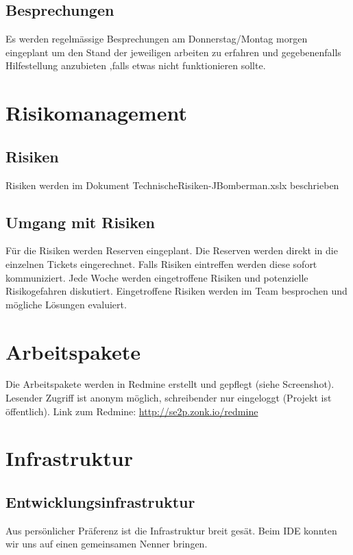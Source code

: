 \documentclass[11pt]{scrartcl}
\begin{document}
\subsection{Besprechungen}
Es werden regelmässige Besprechungen am 
Donnerstag/Montag morgen eingeplant um 
den Stand der jeweiligen arbeiten zu erfahren 
und gegebenenfalls Hilfestellung anzubieten 
,falls etwas nicht funktionieren sollte.

\section{Risikomanagement}
\label{Risikomanagement}
\subsection{Risiken}
\label{sec:Risiken}
Risiken werden im Dokument TechnischeRisiken-JBomberman.xslx beschrieben
\subsection{Umgang mit Risiken}
\label{sec:Umgang mit Risiken}
Für die Risiken werden Reserven eingeplant. Die Reserven werden direkt in die einzelnen Tickets eingerechnet. Falls Risiken eintreffen werden diese sofort kommuniziert. Jede Woche werden eingetroffene Risiken und potenzielle Risikogefahren diskutiert. Eingetroffene Risiken werden im Team besprochen und mögliche Lösungen evaluiert.

\section{Arbeitspakete}
\label{sec:Arbeitspakete}
Die Arbeitspakete werden in Redmine erstellt und gepflegt (siehe Screenshot). Lesender Zugriff ist anonym möglich, schreibender nur eingeloggt (Projekt ist öffentlich).
Link zum Redmine: \href{http://se2p.zonk.io/redmine}{http://se2p.zonk.io/redmine}

\section{Infrastruktur}
\label{sec:Infrastruktur}

\subsection{Entwicklungsinfrastruktur}
\label{sec:Entwicklungsinfrastruktur}
Aus persönlicher Präferenz ist die Infrastruktur breit gesät. Beim IDE konnten wir uns auf einen gemeinsamen Nenner bringen.
\end{document}
